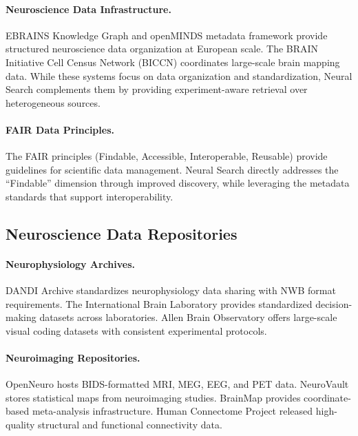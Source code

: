 \documentclass{article}
\theoremstyle{definition}
\begin{document}
\paragraph{Neuroscience Data Infrastructure.} EBRAINS Knowledge Graph \citep{amunts2019ebrains} and openMINDS metadata framework provide structured neuroscience data organization at European scale. The BRAIN Initiative Cell Census Network (BICCN) \citep{ecker2017brain} coordinates large-scale brain mapping data. While these systems focus on data organization and standardization, Neural Search complements them by providing experiment-aware retrieval over heterogeneous sources.

\paragraph{FAIR Data Principles.} The FAIR principles \citep{wilkinson2016fair} (Findable, Accessible, Interoperable, Reusable) provide guidelines for scientific data management. Neural Search directly addresses the ``Findable'' dimension through improved discovery, while leveraging the metadata standards that support interoperability.

\subsection{Neuroscience Data Repositories}

\paragraph{Neurophysiology Archives.} DANDI Archive \citep{rubinen2024dandi} standardizes neurophysiology data sharing with NWB format requirements. The International Brain Laboratory \citep{ibl2021standardized} provides standardized decision-making datasets across laboratories. Allen Brain Observatory \citep{allen2019brain} offers large-scale visual coding datasets with consistent experimental protocols.

\paragraph{Neuroimaging Repositories.} OpenNeuro \citep{markiewicz2021openneuro} hosts BIDS-formatted MRI, MEG, EEG, and PET data. NeuroVault \citep{gorgolewski2015neurovault} stores statistical maps from neuroimaging studies. BrainMap \citep{laird2005brainmap} provides coordinate-based meta-analysis infrastructure. Human Connectome Project \citep{van2013wu} released high-quality structural and functional connectivity data.
\end{document}

